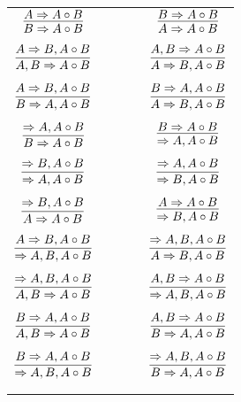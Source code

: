 \documentclass[11pt]{article}
\begin{document}
\begin{center}
\begin{tabular}{ccc}
$\infer{B\Rightarrow A\circ B}{A\Rightarrow A\circ B}$	& \ \ \ \ & $\infer{A\Rightarrow A\circ B}{B\Rightarrow A\circ B}$ \\
	&& \\
$\infer{A, B\Rightarrow A\circ B}{A\Rightarrow B, A\circ B}$	&& $\infer{A\Rightarrow B, A\circ B}{A, B\Rightarrow A\circ B}$ \\
	&& \\
$\infer{B\Rightarrow A, A\circ B}{A\Rightarrow B, A\circ B}$	&& $\infer{A\Rightarrow B, A\circ B}{B\Rightarrow A, A\circ B}$ \\
	&& \\
$\infer{B\Rightarrow A\circ B}{\Rightarrow A, A\circ B}$	&& $\infer{\Rightarrow A, A\circ B}{B\Rightarrow A\circ B}$ \\
	&& \\
$\infer{\Rightarrow A, A\circ B}{\Rightarrow B, A\circ B}$	&& $\infer{\Rightarrow B, A\circ B}{\Rightarrow A, A\circ B}$ \\
	&& \\
$\infer{A\Rightarrow A\circ B}{\Rightarrow B, A\circ B}$	&& $\infer{\Rightarrow B, A\circ B}{A\Rightarrow A\circ B}$ \\
	&& \\
$\infer{\Rightarrow A, B, A\circ B}{A\Rightarrow B, A\circ B}$	&& $\infer{A\Rightarrow B, A\circ B}{\Rightarrow A, B, A\circ B}$ \\
	&& \\
$\infer{A, B\Rightarrow A\circ B}{\Rightarrow A, B, A\circ B}$	&& $\infer{\Rightarrow A, B, A\circ B}{A, B\Rightarrow A\circ B}$ \\
	&& \\
$\infer{A, B\Rightarrow A\circ B}{B\Rightarrow A, A\circ B}$	&& $\infer{B\Rightarrow A, A\circ B}{A, B\Rightarrow A\circ B}$ \\
	&& \\
$\infer{\Rightarrow A, B, A\circ B}{B\Rightarrow A, A\circ B}$	&& $\infer{B\Rightarrow A, A\circ B}{\Rightarrow A, B, A\circ B}$ \\
	&& \\
	&& \\
\end{tabular}


















































\end{center}
\end{document}
